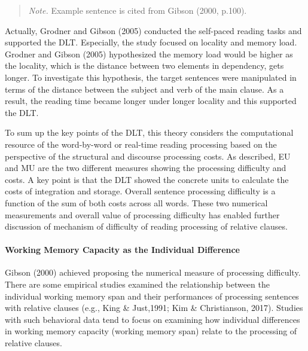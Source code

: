 \documentclass[
]{article}
\begin{document}
\vspace{-0.5em}
\begin{quote}
\textit{Note.} Example sentence is cited from Gibson (2000, p.100).
\end{quote}
\vspace{1em}

\vspace{1em}

Actually, Grodner and Gibson (2005) conducted the self-paced reading
tasks and supported the DLT. Especially, the study focused on locality
and memory load. Grodner and Gibson (2005) hypothesized the memory load
would be higher as the locality, which is the distance between two
elements in dependency, gets longer. To investigate this hypothesis, the
target sentences were manipulated in terms of the distance between the
subject and verb of the main clause. As a result, the reading time
became longer under longer locality and this supported the DLT.

To sum up the key points of the DLT, this theory considers the
computational resource of the word-by-word or real-time reading
processing based on the perspective of the structural and discourse
processing costs. As described, EU and MU are the two different measures
showing the processing difficulty and costs. A key point is that the DLT
showed the concrete units to calculate the costs of integration and
storage. Overall sentence processing difficulty is a function of the sum
of both costs across all words. These two numerical measurements and
overall value of processing difficulty has enabled further discussion of
mechanism of difficulty of reading processing of relative clauses.

\paragraph{Working Memory Capacity as the Individual
Difference}\label{working-memory-capacity-as-the-individual-difference}

Gibson (2000) achieved proposing the numerical measure of processing
difficulty. There are some empirical studies examined the relationship
between the individual working memory span and their performances of
processing sentences with relative clauses (e.g., King \& Just,1991; Kim
\& Christianson, 2017). Studies with such behavioral data tend to focus
on examining how individual differences in working memory capacity
(working memory span) relate to the processing of relative clauses.
\end{document}
